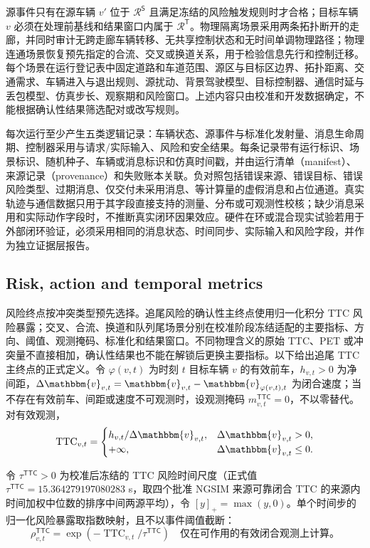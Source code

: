 \documentclass[10pt,a4paper,twocolumn]{article}
\begin{document}
源事件只有在源车辆 $v'$ 位于 $\mathcal R^{\mathsf S}$ 且满足冻结的风险触发规则时才合格；目标车辆 $v$ 必须在处理前基线和结果窗口内属于 $\mathcal R^{\mathsf T}$。物理隔离场景采用两条拓扑断开的走廊，并同时审计无跨走廊车辆转移、无共享控制状态和无时间单调物理路径；物理连通场景恢复预先指定的合流、交叉或换道关系，用于检验信息先行和控制迁移。每个场景在运行登记表中固定道路和车道范围、源区与目标区边界、拓扑距离、交通需求、车辆进入与退出规则、源扰动、背景驾驶模型、目标控制器、通信时延与丢包模型、仿真步长、观察期和风险窗口。上述内容只由校准和开发数据确定，不能根据确认性结果筛选配对或改写规则。

每次运行至少产生五类逻辑记录：车辆状态、源事件与标准化发射量、消息生命周期、控制器采用与请求/实际输入、风险和安全结果。每条记录带有运行标识、场景标识、随机种子、车辆或消息标识和仿真时间戳，并由运行清单（manifest）、来源记录（provenance）和失败账本关联。负对照包括错误来源、错误目标、错误风险类型、过期消息、仅交付未采用消息、等计算量的虚假消息和占位通道。真实轨迹与通信数据只用于其字段直接支持的测量、分布或可观测性校核\cite{ngsim2016dataset,coifman2017ngsim,barmpounakis2020pneuma,pneuma2024dataset,spmd2014dataset,zhan2019interaction}；缺少消息采用和实际动作字段时，不推断真实闭环因果效应。硬件在环或混合现实试验若用于外部闭环验证，必须采用相同的消息状态、时间同步、实际输入和风险字段，并作为独立证据层报告。

\subsection*{Risk, action and temporal metrics}
风险终点按冲突类型预先选择。追尾风险的确认性主终点使用归一化积分 TTC 风险暴露；交叉、合流、换道和队列尾场景分别在校准阶段冻结适配的主要指标、方向、阈值、观测掩码、标准化和结果窗口。不同物理含义的原始 TTC、PET 或冲突量不直接相加，确认性结果也不能在解锁后更换主要指标。以下给出追尾 TTC 主终点的正式定义。令 $\varphi(v,t)$ 为时刻 $t$ 目标车辆 $v$ 的有效前车，$h_{v,t}>0$ 为净间距，$\Delta \mathbbm{v}_{v,t}=\mathbbm{v}_{v,t}-\mathbbm{v}_{\varphi(v,t),t}$ 为闭合速度；当不存在有效前车、间距或速度不可观测时，设观测掩码 $m_{v,t}^{\mathsf{TTC}}=0$，不以零替代。对有效观测，
\begin{equation*}
\operatorname{TTC}_{v,t}=
\begin{cases}
h_{v,t}/\Delta \mathbbm{v}_{v,t},&\Delta \mathbbm{v}_{v,t}>0,\\
+\infty,&\Delta \mathbbm{v}_{v,t}\leq 0.
\end{cases}
\end{equation*}

令 $\tau^{\mathsf{TTC}}>0$ 为校准后冻结的 TTC 风险时间尺度（正式值 $\tau^{\mathsf{TTC}}=15.364279197080283$ s，取四个批准 NGSIM 来源可靠闭合 TTC 的来源内时间加权中位数的排序中间两源平均），令 $[y]_+=\max(y,0)$。单个时间步的归一化风险暴露取指数映射，且不以事件阈值截断：
\begin{equation*}
\rho_{v,t}^{\mathsf{TTC}}
=\exp\!\left(-\operatorname{TTC}_{v,t}\big/\tau^{\mathsf{TTC}}\right)
\quad\text{仅在可作用的有效闭合观测上计算。}
\end{equation*}
\end{document}
